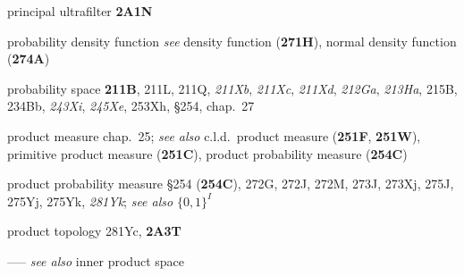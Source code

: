 principal ultrafilter {\bf 2A1N}










probability density function {\it see} density function ({\bf 271H}),
normal density function ({\bf 274A})


probability space {\bf 211B}, 211L, 211Q, {\it 211Xb}, {\it 211Xc}, {\it 211Xd},
{\it 212Ga}, {\it 213Ha}, 215B, 234Bb, {\it 243Xi},
{\it 245Xe}, 253Xh, \S254, chap.\ 27











  





product measure chap.\ 25; 
  {\it see also} c.l.d.\ product measure ({\bf 251F}, {\bf 251W}),
primitive product measure ({\bf 251C}),
product probability measure ({\bf 254C})












product probability measure \S254 ({\bf 254C}), 272G, 272J, 272M,
273J, 273Xj, 275J, 275Yj, 275Yk, {\it 281Yk}; 
  {\it see also } $\{0,1\}^I$















product topology 281Yc, {\bf 2A3T}




----- {\it see also} inner product space






















































